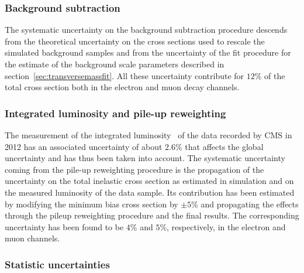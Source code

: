 \subsubsection{Background subtraction}

The systematic uncertainty on the background subtraction procedure 
descends from the theoretical uncertainty on the cross sections used to rescale
the simulated background samples and from the uncertainty of the fit 
procedure for the estimate of the background scale parameters described in 
section~\ref{sec:transversemassfit}. 
All these uncertainty contribute for $12\%$ of the total cross section both 
in the electron and muon decay channels.

\subsubsection{Integrated luminosity and pile-up reweighting}

The measurement of the integrated luminosity~\cite{luminosity} 
of the data recorded by CMS in 2012
has an associated uncertainty of about $2.6\%$ that affects the global
uncertainty and has thus been taken into account.
The systematic uncertainty coming from the pile-up reweighting
procedure is the propagation of the uncertainty on the total inelastic 
cross section as estimated in simulation and on the measured luminosity 
of the data sample.
Its contribution has been estimated by 
modifying the minimum bias cross section 
by $\pm 5 \%$ and propagating the effects through the 
pileup reweighting procedure and the final results. 
The corresponding uncertainty has been found to be $4\%$ and $5\%$,
respectively, in the electron and muon channels.

\subsubsection{Statistic uncertainties}

